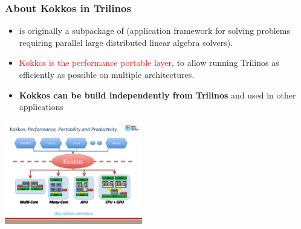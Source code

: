 \begin{frame}
  \frametitle{About Kokkos in Trilinos}

  \begin{itemize}
  \item {} is originally a subpackage of  (application framework for solving problems requiring parallel large distributed linear algebra solvers).
  \item \textcolor{red}{Kokkos is the performance portable layer}, to allow running Trilinos as efficiently as possible on multiple architectures.
  \item \textbf{Kokkos can be build independently from Trilinos} and used in other applications
  \end{itemize}

  \begin{center}
    \includegraphics[width=6cm]{images/Kokkos-Multi-CoE_slide2}
  \end{center}
  
\end{frame}


